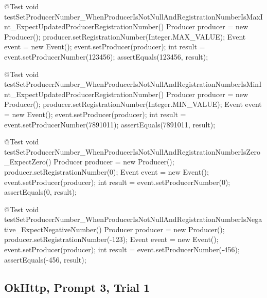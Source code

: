 \begin{answer}
{  @Test
  void testSetProducerNumber_WhenProducerIsNotNullAndRegistrationNumberIsMaxInt_ExpectUpdatedProducerRegistrationNumber() {
      Producer producer = new Producer();
      producer.setRegistrationNumber(Integer.MAX_VALUE);
      Event event = new Event();
      event.setProducer(producer);
      int result = event.setProducerNumber(123456);
      assertEquals(123456, result);
  }

  @Test
  void testSetProducerNumber_WhenProducerIsNotNullAndRegistrationNumberIsMinInt_ExpectUpdatedProducerRegistrationNumber() {
      Producer producer = new Producer();
      producer.setRegistrationNumber(Integer.MIN_VALUE);
      Event event = new Event();
      event.setProducer(producer);
      int result = event.setProducerNumber(7891011);
      assertEquals(7891011, result);
  }

  @Test
  void testSetProducerNumber_WhenProducerIsNotNullAndRegistrationNumberIsZero_ExpectZero() {
      Producer producer = new Producer();
      producer.setRegistrationNumber(0);
      Event event = new Event();
      event.setProducer(producer);
      int result = event.setProducerNumber(0);
      assertEquals(0, result);
  }

  @Test
  void testSetProducerNumber_WhenProducerIsNotNullAndRegistrationNumberIsNegative_ExpectNegativeNumber() {
      Producer producer = new Producer();
      producer.setRegistrationNumber(-123);
      Event event = new Event();
      event.setProducer(producer);
      int result = event.setProducerNumber(-456);
      assertEquals(-456, result);
  }
}
\end{answer}

\subsection{OkHttp, Prompt 3, Trial 1}

